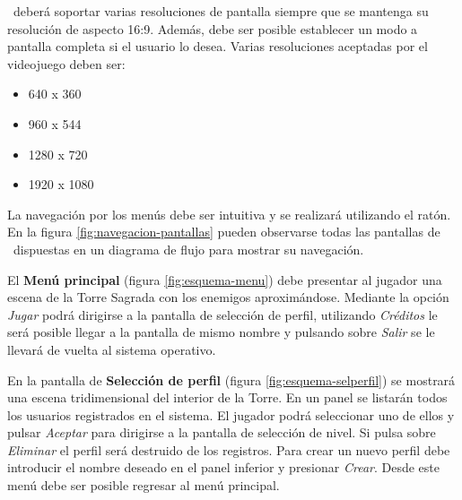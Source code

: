 \juego\ deberá soportar varias resoluciones de pantalla siempre que se mantenga
su resolución de aspecto 16:9. Además, debe ser posible establecer un modo
a pantalla completa si el usuario lo desea. Varias resoluciones aceptadas
por el videojuego deben ser:

\begin{itemize}
    \itemsep0em
    \item 640 x 360
    \item 960 x 544
    \item 1280 x 720
    \item 1920 x 1080
\end{itemize}

La navegación por los menús debe ser intuitiva y se realizará utilizando
el ratón. En la figura \ref{fig:navegacion-pantallas} pueden observarse
todas las pantallas de \juego\ dispuestas en un diagrama de flujo para
mostrar su navegación.\\


El \textbf{Menú principal} (figura \ref{fig:esquema-menu}) debe presentar
al jugador una escena de la Torre Sagrada con los enemigos aproximándose.
Mediante la opción \emph{Jugar} podrá dirigirse a la pantalla de selección
de perfil, utilizando \emph{Créditos} le será posible llegar a la pantalla
de mismo nombre y pulsando sobre \emph{Salir} se le llevará de vuelta al
sistema operativo.\\


En la pantalla de \textbf{Selección de perfil} (figura \ref{fig:esquema-selperfil})
se mostrará una escena tridimensional del interior de la Torre. En un panel
se listarán todos los usuarios registrados en el sistema. El jugador podrá
seleccionar uno de ellos y pulsar \emph{Aceptar} para dirigirse a la
pantalla de selección de nivel. Si pulsa sobre \emph{Eliminar} el perfil
será destruido de los registros. Para crear un nuevo perfil debe introducir
el nombre deseado en el panel inferior y presionar \emph{Crear}. Desde este
menú debe ser posible regresar al menú principal.\\


